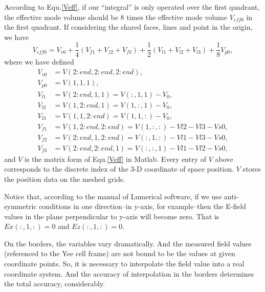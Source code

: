 According to Equ.\eqref{Veff}, if our ``integral'' is only operated over the first quadrant, the effective mode volume should be 8 times the effective mode volume $V_{eff0}$ in the first quadrant. If considering the shared faces, lines and point in the origin, we have
\begin{equation}
 V_{eff0}=V_{v0}+\frac{1}{4}(V_{f1}+V_{f2}+V_{f3})+\frac{1}{2}(V_{l1}+V_{l2}+V_{l3})+\frac{1}{8}V_{p0},
\end{equation}
where we have defined
\begin{subequations}
 \begin{align}
  V_{v0} &=V(2:end,2:end,2:end), \\
  V_{p0} &=V(1,1,1), \\
  V_{l1} &=V(2:end,1,1)=V(:,1,1)-V_0, \\
  V_{l2} &=V(1,2:end,1)=V(1,:,1)-V_0, \\
  V_{l3} &=V(1,1,2:end)=V(1,1,:)-V_0, \\
  V_{f1} &=V(1,2:end,2:end)=V(1,:,:)-Vl2-Vl3-Vs0, \\
  V_{f2} &=V(2:end,1,2:end)=V(:,1,:)-Vl1-Vl3-Vs0, \\
  V_{f3} &=V(2:end,2:end,1)=V(:,:,1)-Vl1-Vl2-Vs0,
 \end{align}
\label{vparts}
\end{subequations}
and $V$ is the matrix form of Equ.\eqref{Veff} in Matlab. Every entry of $V$ above corresponds to the discrete index of the 3-D coordinate of space position. $V$ stores the position data on the meshed grids.


Notice that, according to the manual of Lumerical software, if we use anti-symmetric conditions in one direction--in y-axis, for example--then the E-field values in the plane perpendicular to y-axis will become zero. That is $Ex(:,1,:)=0$ and $Ez(:,1,:)=0$.

On the borders, the variables vary dramatically. And the measured field values (referenced to the Yee cell frame) are not bound to be the values at given coordinate points. So, it is necessary to interpolate the field value into a real coordinate system. And the accuracy of interpolation in the borders determines the total accuracy, considerably.

